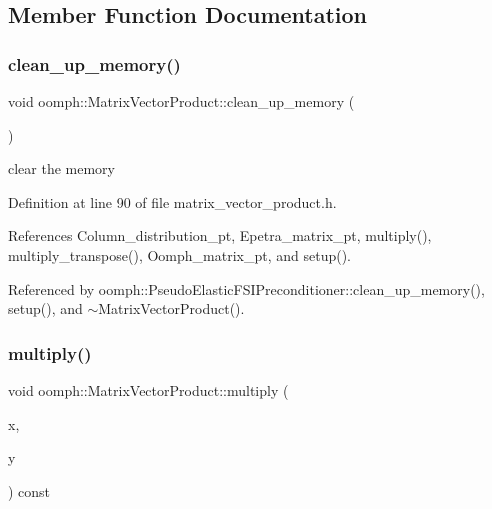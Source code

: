 \subsection{Member Function Documentation}
\mbox{\label{classoomph_1_1MatrixVectorProduct_a2f61122d228e81ccff144b1298ccbd36}} 
\subsubsection{\texorpdfstring{clean\+\_\+up\+\_\+memory()}{clean\_up\_memory()}}
{\footnotesize\ttfamily void oomph\+::\+Matrix\+Vector\+Product\+::clean\+\_\+up\+\_\+memory (\begin{DoxyParamCaption}{ }\end{DoxyParamCaption})\hspace{0.3cm}{\ttfamily [inline]}}



clear the memory 



Definition at line 90 of file matrix\+\_\+vector\+\_\+product.\+h.



References Column\+\_\+distribution\+\_\+pt, Epetra\+\_\+matrix\+\_\+pt, multiply(), multiply\+\_\+transpose(), Oomph\+\_\+matrix\+\_\+pt, and setup().



Referenced by oomph\+::\+Pseudo\+Elastic\+F\+S\+I\+Preconditioner\+::clean\+\_\+up\+\_\+memory(), setup(), and $\sim$\+Matrix\+Vector\+Product().

\mbox{\label{classoomph_1_1MatrixVectorProduct_ac29ba50f1a77bf0e316c3417bcff71ee}} 
\subsubsection{\texorpdfstring{multiply()}{multiply()}}
{\footnotesize\ttfamily void oomph\+::\+Matrix\+Vector\+Product\+::multiply (\begin{DoxyParamCaption}\item[{const \hyperlink{classoomph_1_1DoubleVector}{Double\+Vector} \&}]{x,  }\item[{\hyperlink{classoomph_1_1DoubleVector}{Double\+Vector} \&}]{y }\end{DoxyParamCaption}) const}




